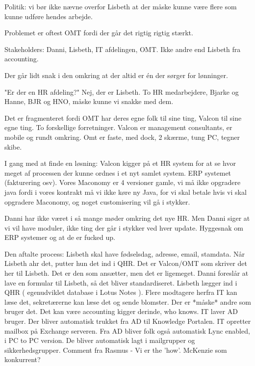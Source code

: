 \begin{linenumbers*}
Politik: vi bør ikke nævne overfor Lisbeth at der måske kunne være flere som kunne udføre hendes arbejde.

Problemet er oftest OMT fordi der går det rigtig rigtig stærkt.


Stakeholders: Danni, Lisbeth, IT afdelingen, OMT. Ikke andre end Lisbeth fra accounting.


Der går lidt snak i den omkring at der altid er én der sørger for lønninger.


"Er der en HR afdeling?" Nej, der er Lisbeth. To HR medarbejdere, Bjarke og Hanne, BJR og HNO, måske kunne vi snakke med dem.


Det er fragmenteret fordi OMT har deres egne folk til sine ting, Valcon til sine egne ting. To forskellige forretninger. Valcon er management consultants, er mobile og rundt omkring. Omt er faste, med dock, 2 skærme, tung PC, tegner skibe.


I gang med at finde en løsning: Valcon kigger på et HR system for at se hvor meget af processen der kunne ordnes i et nyt samlet system. 
ERP systemet (fakturering osv). Vores Maconomy er 4 versioner gamle, vi må ikke opgradere java fordi i vores kontrakt må vi ikke køre ny Java, for vi skal betale hvis vi skal opgradere Maconomy, og noget customisering vil gå i stykker.


Danni har ikke været i så mange møder omkring det nye HR. Men Danni siger at vi vil have moduler, ikke ting der går i stykker ved hver update.
Hyggesnak om ERP systemer og at de er fucked up.


Den aftalte process: Lisbeth skal have fødselsdag, adresse, email, stamdata. Når Lisbeth ahr det, putter hun det ind i QHR. Det er Valcon/OMT som skriver det her til Lisbeth. Det er den som ansætter, men det er ligemeget.
Danni foreslår at lave en formular til Lisbeth, så det bliver standardiseret.
Lisbeth lægger ind i QHR ( egenudviklet database i Lotus Notes ). Flere modtagere herfra
IT kan læse det, sekretærerne kan læse det og sende blomster. Der er *måske* andre som bruger det. Det kan være accounting kigger derinde, who knows.
IT laver AD bruger. Der bliver automatisk trukket fra AD til Knowledge Portalen. IT opretter mailbox på Exchange serveren. Fra AD bliver folk også automatisk Lync enabled, i PC to PC version. De bliver automatisk lagt i mailgrupper og sikkerhedsgrupper.
Comment fra Rasmus - Vi er the 'how'. McKenzie som konkurrent?
\end{linenumbers*}